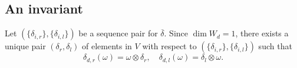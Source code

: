 \documentclass[a4paper,10pt]{amsart}
\newtheorem{proposition}[theorem]{Proposition}
\theoremstyle{definition}
\numberwithin{equation}{section}
\DeclareMathOperator{\Image}{Im} \DeclareMathOperator{\Ext}{Ext}
\DeclareMathOperator{\id}{id}
\begin{document}
%
%
%
%
%
\subsection{An invariant}


Let $\left(\{\delta_{i,r}\},\{\delta_{i,l}\}\right)$ be a sequence pair for $\overline{\delta}$. Since $\dim W_d=1$, there exists a unique pair $(\delta_r,\delta_l)$ of elements in $V$ with respect to $\left(\{\delta_{i,r}\},\{\delta_{i,l}\}\right)$  such that
$$\delta_{d,r}(\omega)=\omega\otimes \delta_r,\quad \delta_{d,l}(\omega)=\delta_l\otimes \omega.$$
\end{document}
